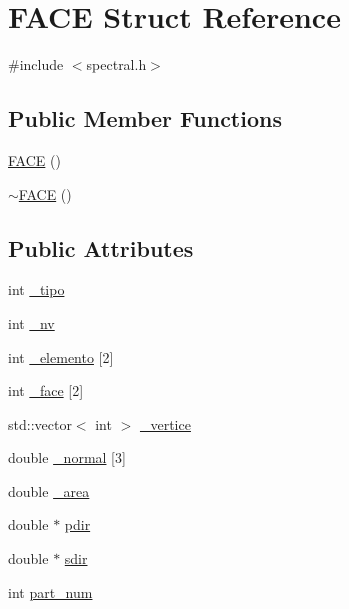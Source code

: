 \hypertarget{structFACE}{}\section{F\+A\+CE Struct Reference}
\label{structFACE}


{\ttfamily \#include $<$spectral.\+h$>$}

\subsection*{Public Member Functions}
\begin{DoxyCompactItemize}
\item 
\hyperlink{structFACE_ab27891b21cc65be0ed66bb984bd8f347}{F\+A\+CE} ()
\item 
\hyperlink{structFACE_a312735b7baae8686bf238377ff8caf81}{$\sim$\+F\+A\+CE} ()
\end{DoxyCompactItemize}
\subsection*{Public Attributes}
\begin{DoxyCompactItemize}
\item 
int \hyperlink{structFACE_aa7ed87f6d16ef69445c966c26b9044ff}{\+\_\+tipo}
\item 
int \hyperlink{structFACE_a26e0cd25d7a18046b6a80f0815246667}{\+\_\+nv}
\item 
int \hyperlink{structFACE_a9eb92fef619b9f6572dad67032f12789}{\+\_\+elemento} \mbox{[}2\mbox{]}
\item 
int \hyperlink{structFACE_a350498fd21fda2edb4f660a76204f26d}{\+\_\+face} \mbox{[}2\mbox{]}
\item 
std\+::vector$<$ int $>$ \hyperlink{structFACE_a70d99e98683b8ecddb3cd8ba22f747f3}{\+\_\+vertice}
\item 
double \hyperlink{structFACE_ae3e59914e6ad07eb003a732ad7905313}{\+\_\+normal} \mbox{[}3\mbox{]}
\item 
double \hyperlink{structFACE_a47ac2239337038a14e42f2bb8c9416ae}{\+\_\+area}
\item 
double $\ast$ \hyperlink{structFACE_a6ef1293fa7979984be6e8a27126a4e83}{pdir}
\item 
double $\ast$ \hyperlink{structFACE_a1ce0e6eb1b664281eec931c0adb2f314}{sdir}
\item 
int \hyperlink{structFACE_a2f3e5298e014da1f7bbc8e61a9301ef8}{part\+\_\+num}
\end{DoxyCompactItemize}



